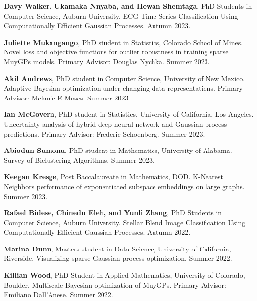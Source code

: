 \begin{innerlist}

  \item[] \textbf{Davy Walker, Ukamaka Nnyaba, and Hewan Shemtaga},
  PhD Students in Computer Science,
  Auburn University.
  ECG Time Series Classification Using Computationally Efficient Gaussian
  Processes.
  Autumn 2023.

  \item[] \textbf{Juliette Mukangango},
  PhD student in Statistics,
  Colorado School of Mines.
  Novel loss and objective functions for outlier robustness in training sparse
  MuyGPs models.
  Primary Advisor: Douglas Nychka.
  Summer 2023.

  \item[] \textbf{Akil Andrews},
  PhD student in Computer Science,
  University of New Mexico.
  Adaptive Bayesian optimization under changing data representations.
  Primary Advisor: Melanie E Moses.
  Summer 2023.

  \item[] \textbf{Ian McGovern},
  PhD student in Statistics,
  University of California, Los Angeles.
  Uncertainty analysis of hybrid deep neural network and Gaussian process
  predictions.
  Primary Advisor: Frederic Schoenberg.
  Summer 2023.

  \item[] \textbf{Abiodun Sumonu},
  PhD student in Mathematics,
  University of Alabama.
  Survey of Biclustering Algorithms.
  Summer 2023.

  \item[] \textbf{Keegan Kresge},
  Post Baccalaureate in Mathematics,
  DOD.
  K-Nearest Neighbors performance of exponentiated subspace embeddings on large
  graphs.
  Summer 2023.

  \item[] \textbf{Rafael Bidese, Chinedu Eleh, and Yunli Zhang},
  PhD Students in Computer Science,
  Auburn University.
  Stellar Blend Image Classification Using Computationally Efficient Gaussian
  Processes.
  Autumn 2022.

  \item[] \textbf{Marina Dunn},
  Masters student in Data Science,
  University of California, Riverside.
  Visualizing sparse Gaussian process optimization.
  Summer 2022.

  \item[] \textbf{Killian Wood},
  PhD Student in Applied Mathematics,
  University of Colorado, Boulder.
  Multiscale Bayesian optimization of MuyGPs.
  Primary Advisor: Emiliano Dall'Anese.
  Summer 2022.


\end{innerlist}
